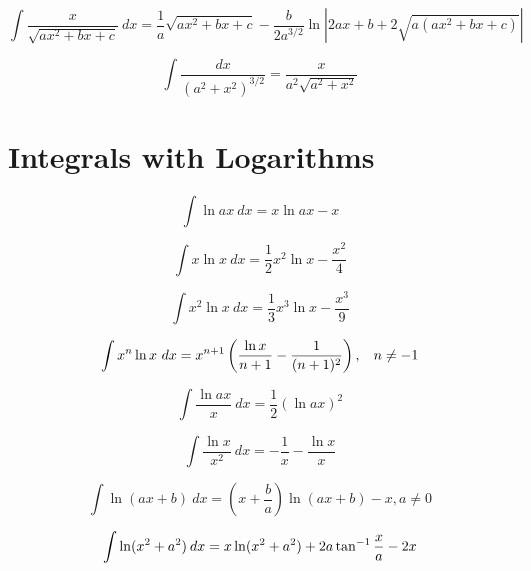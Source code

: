\documentclass[12pt,a4paper,leqno]{article}
\begin{document}
   \begin{equation}\label{eq:Duley}
   \int \frac{x}{\sqrt{ax^2+bx+c}}\ dx=
   \frac{1}{a}\sqrt{ax^2+bx + c}
   -
   \frac{b}{2a^{3/2}}\ln \left| 2ax+b + 2 \sqrt{a(ax^2+bx+c)} \right |
   \end{equation}

   \begin{equation}\label{eq:Winokur2}
   \int\frac{dx}{(a^2+x^2)^{3/2}}=\frac{x}{a^2\sqrt{a^2+x^2}}
   \end{equation}



   \section*{Integrals with Logarithms}

   \begin{equation}
   \int \ln ax\  dx = x \ln ax - x
   \end{equation}

   \begin{equation}
   \int x \ln x \ dx = \frac{1}{2} x^2 \ln x-\frac{x^2}{4}
   \end{equation}

   \begin{equation}
   \int x^2 \ln x \ dx = \frac{1}{3} x^3 \ln x-\frac{x^3}{9}
   \end{equation}

   \begin{equation}
   \int x^n \ln x\ dx = x^{n+1}\left( \dfrac{\ln x}{n+1}-\dfrac{1}{(n+1)^2}\right),\hspace{2ex} n\neq -1
   \end{equation}


   \begin{equation}
   \int \frac{\ln ax}{x}\ dx = \frac{1}{2}\left ( \ln ax \right)^2
   \end{equation}

   \begin{equation}
   \int \frac{\ln x}{x^2}\ dx = -\frac{1}{x}-\frac{\ln x}{x}
   \end{equation}

   \begin{equation}
   \int \ln (ax + b) \ dx = \left ( x + \frac{b}{a} \right) \ln (ax+b) - x , a\ne 0
   \end{equation}

   \begin{equation}
   \int \ln  ( x^2 + a^2 )\hspace{.5ex} {dx} = x \ln (x^2 + a^2  ) +2a\tan^{-1} \frac{x}{a} - 2x
   \end{equation}
\end{document}
